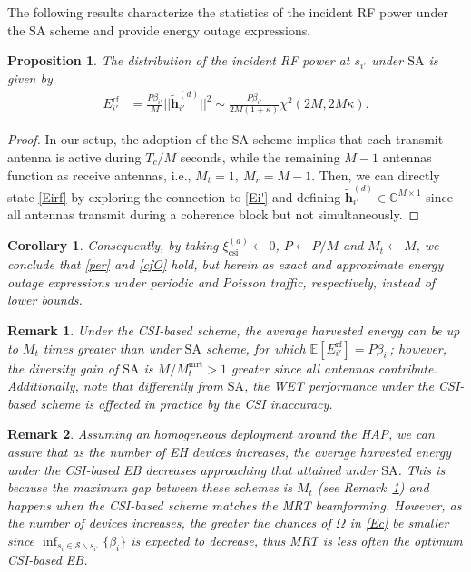 \documentclass[10pt,journal,a4paper]{IEEEtran}
\newtheorem{proposition}{Proposition}
\newtheorem{corollary}{Corollary}
\newtheorem{remark}{Remark}
\begin{document}
	The following results characterize the statistics of the incident RF power under the $\mathrm{SA}$ scheme and provide energy outage expressions.
	\begin{proposition}
		The distribution of the incident RF power at $s_{i'}$ under $\mathrm{SA}$ is given by
		\begin{align}
		E_{i'}^\mathrm{rf}&=\frac{P\beta_{i'}}{M}||\mathbf{\tilde{h}}_{i'}^{(d)}||^2
		\sim \frac{P\beta_{i'}}{2M(1+\kappa)}\chi^2(2M,2M\kappa).\label{Eirf}
		\end{align}
	\end{proposition}
%
\begin{proof}
	In our setup, the adoption of the SA scheme implies that each transmit antenna is active during $T_c/M$ seconds, while the remaining $M\!-\!1$ antennas function as receive antennas, i.e., $M_t\!=\!1,\ M_r\!=\!M\!-\!1$. Then, we can directly state \eqref{Eirf} by exploring the connection to \eqref{Ei'} and defining $\mathbf{\tilde{h}}_{i'}^{(d)}\in\mathbb{C}^{M\times 1}$ since all antennas  transmit during a coherence block but not simultaneously.
\end{proof}
	\begin{corollary}\label{cor1}
		Consequently, by taking $\xi_\mathrm{csi}^{(d)}\leftarrow 0$, $P\leftarrow P/M$ and $M_t\leftarrow M$, we conclude that \eqref{per} and \eqref{cfO} hold, but herein as exact and approximate energy outage expressions under periodic and Poisson traffic,  respectively, instead of lower bounds.
	\end{corollary}
	\begin{remark}\label{re4}
		Under the CSI-based scheme, the average harvested energy can be up to $M_t$ times greater than under $\mathrm{SA}$ scheme, for which $\mathbb{E}[E_{i'}^\mathrm{rf}]=P\beta_{i'}$; however, the diversity gain of $\mathrm{SA}$ is $M/M_t^{\mathrm{mrt}}>1$ greater since all antennas contribute. Additionally, note that differently from $\mathrm{SA}$,  the WET performance under the CSI-based scheme is affected in practice by the CSI inaccuracy.
	\end{remark}
%
\begin{remark}\label{re4p5}
	Assuming an homogeneous deployment around the HAP, we can assure that as the number of EH devices increases, the average harvested energy under the CSI-based EB decreases approaching that attained under  $\mathrm{SA}$. This is because the maximum gap between these schemes is $M_t$ (see Remark~\ref{re4}) and happens when the CSI-based scheme matches the MRT beamforming. However, as the number of devices increases, the greater the chances of $\Omega$ in \eqref{Ec} be smaller since $\inf_{s_i\in\mathcal{S}\backslash s_{i'}}\{\beta_i\}$ is expected to decrease,  thus MRT is less often the optimum CSI-based EB.
\end{remark}
\end{document}
